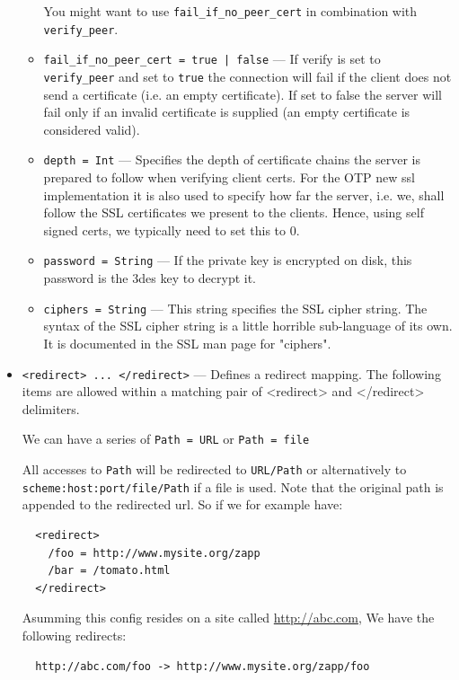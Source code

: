 \documentclass[11pt,oneside,english]{book}
\begin{document}
\begin{itemize}
\begin{itemize}
                 You might want to use \verb+fail_if_no_peer_cert+ in
                 combination with \verb+verify_peer+.

               \item \verb+fail_if_no_peer_cert = true | false+ --- If verify is
                 set to \verb+verify_peer+ and set to \verb+true+ the connection
                 will fail if the client does not send a certificate (i.e. an
                 empty certificate). If set to false the server will fail only
                 if an invalid certificate is supplied (an empty certificate is
                 considered valid).

               \item \verb+depth = Int+ --- Specifies the depth of certificate
                 chains the server is prepared to follow when verifying client
                 certs. For the OTP new ssl implementation it is also used to
                 specify how far the server, i.e. we, shall follow the SSL
                 certificates we present to the clients. Hence, using self
                 signed certs, we typically need to set this to 0.

               \item \verb+password = String+ --- If the private key is
                 encrypted on disk, this password is the 3des key to decrypt it.

               \item \verb+ciphers = String+ --- This string specifies the SSL
                 cipher string.  The syntax of the SSL cipher string is a little
                 horrible sub-language of its own.  It is documented in the SSL
                 man page for "ciphers".
               \end{itemize}

\item       \verb+<redirect> ... </redirect>+ ---
              Defines a redirect mapping. The following items are allowed within
              a matching pair of <redirect> and </redirect> delimiters.

              We can have a series of \verb+Path = URL+ or \verb+Path = file+

              All accesses to \verb+Path+ will be redirected to \verb+URL/Path+
              or alternatively to \verb+scheme:host:port/file/Path+ if a file is
              used. Note that the original path is appended to the redirected
              url. So if we for example have:
\begin{verbatim}
  <redirect>
    /foo = http://www.mysite.org/zapp
    /bar = /tomato.html
  </redirect>
\end{verbatim}
              Asumming this config resides on a site called
              \url{http://abc.com}, We have the following redirects:
\begin{verbatim}
  http://abc.com/foo -> http://www.mysite.org/zapp/foo


\end{verbatim}
\end{itemize}
\end{document}
